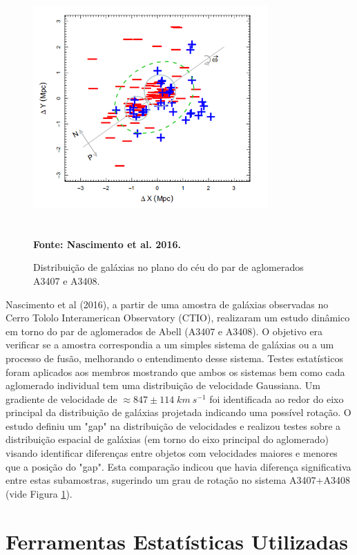 \begin{figure}[H] %
\vspace{-2pt}
\begin{center}
\includegraphics[height=9cm,width=9cm]{04-figuras/nascimento.png}%
\caption{Distribuição de galáxias no plano do céu do par de aglomerados A3407 e A3408.}
 \textbf{Fonte: Nascimento et al. 2016.}
\label{fig3}%
\end{center}
\end{figure}

Nascimento et al (2016), a partir de uma amostra de galáxias observadas no Cerro Tololo Interamerican Observatory (CTIO), realizaram um estudo dinâmico em torno do par de aglomerados de Abell (A3407 e A3408). O objetivo era verificar se a amostra correspondia a um simples sistema de galáxias ou a um processo de fusão, melhorando o entendimento desse sistema. Testes estatísticos foram aplicados aos membros mostrando que ambos os sistemas bem como cada aglomerado individual tem uma distribuição de velocidade Gaussiana. Um gradiente de velocidade de $\approx 847 \pm 114\; {km~s^{-1}}$ foi identificada ao redor do eixo principal da distribuição de galáxias projetada indicando uma possível rotação. 
O estudo definiu um "gap" na distribuição de velocidades e realizou testes sobre a distribuição espacial de galáxias (em torno do eixo principal do aglomerado) visando identificar diferenças entre objetos com velocidades maiores e menores que a posição do "gap". Esta comparação indicou que havia diferença significativa entre estas subamostras, sugerindo um grau de rotação no sistema A3407+A3408 (vide Figura \ref{fig3}).

\chapter{Ferramentas Estatísticas Utilizadas}
